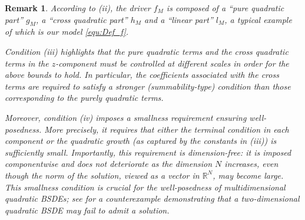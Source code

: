 \documentclass[10pt,a4paper]{article}
\theoremstyle{plain}
\newtheorem{Remark}[Theorem]{Remark}
\theoremstyle{definition}
\numberwithin{equation}{section}
\begin{document}
\begin{Remark}
According to \textnormal{(ii)}, the driver $f_{M}$ is composed of a ``pure quadratic part'' $g_{M}$, a ``cross quadratic part'' $h_{M}$ and a ``linear part'' $l_{M}$, a typical example of which is our model \eqref{equ:Def_f}.

Condition \textnormal{(iii)} highlights that the pure quadratic terms and the cross quadratic terms in the $z$-component must be controlled at different scales in order for the above bounds to hold. In particular, the coefficients associated with the cross terms are required to satisfy a stronger (summability-type) condition than those corresponding to the purely quadratic terms.



Moreover, condition \textnormal{(iv)} imposes a smallness requirement ensuring well-posedness. More precisely, it requires that either the terminal condition in each component or the quadratic growth (as captured by the constants in \textnormal{(iii)}) is sufficiently small. Importantly, this requirement is \emph{dimension-free}: it is imposed componentwise and does not deteriorate as the dimension $N$ increases, even though the norm of the solution, viewed as a vector in $\mathbb{R}^N$, may become large. This smallness condition is crucial for the well-posedness of multidimensional quadratic BSDEs; see \cite[Theorem 2.1]{FR11} for a counterexample demonstrating that a two-dimensional quadratic BSDE may fail to admit a solution.

\end{Remark}
\end{document}

